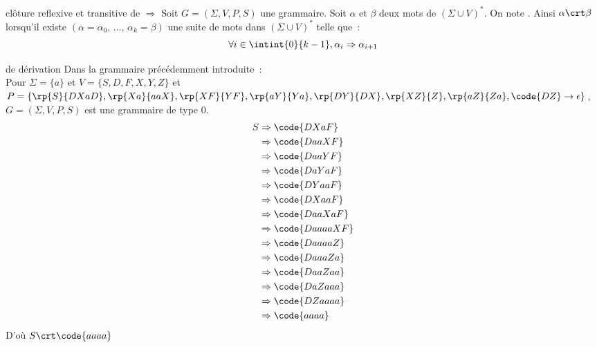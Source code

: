 \begin{adjustwidth}{-3cm}{-3cm}
\begin{definition}{}{clôture reflexive et transitive de $\Rightarrow$}
    Soit $G = (\Sigma, V, P, S)$ une grammaire. Soit $\alpha$ et $\beta$ deux mots de $(\Sigma \cup V)^*$. On note . Ainsi $\alpha \crt \beta$ lorsqu'il existe $(\alpha=\alpha_0,\, \dots,\, \alpha_k = \beta)$ une suite de mots dans $(\Sigma \cup V)^*$ telle que~: 
    $$\forall i \in \intint{0}{k-1}, \alpha_i \Rightarrow  \alpha_{i+1}$$
\end{definition}

\begin{exemple}{}{de dérivation}
    Dans la grammaire précédemment introduite~:\\
    Pour $\Sigma = \{a\}$ et $V = \{S,D,F,X,Y,Z\}$
    et $P = \{\rp{S}{DXaD},\rp{Xa}{aaX},\rp{XF}{YF},\rp{aY}{Ya},\rp{DY}{DX},\rp{XZ}{Z},\rp{aZ}{Za},\code{DZ}\to \epsilon\}$, $G = (\Sigma, V, P, S)$ est une grammaire de type 0.
    \begin{align*}
        S &\Rightarrow \code{DXaF} \\
        &\Rightarrow \code{DaaXF}\\
        &\Rightarrow \code{DaaYF}\\
        &\Rightarrow \code{DaYaF}\\
        &\Rightarrow \code{DYaaF}\\
        &\Rightarrow \code{DXaaF}\\
        &\Rightarrow \code{DaaXaF}\\
        &\Rightarrow \code{DaaaaXF}\\
        &\Rightarrow \code{DaaaaZ}\\
        &\Rightarrow \code{DaaaZa}\\
        &\Rightarrow \code{DaaZaa}\\
        &\Rightarrow \code{DaZaaa}\\
        &\Rightarrow \code{DZaaaa}\\
        &\Rightarrow \code{aaaa}
    \end{align*}
    D'où $S \crt \code{aaaa}$
\end{exemple}


\end{adjustwidth}
